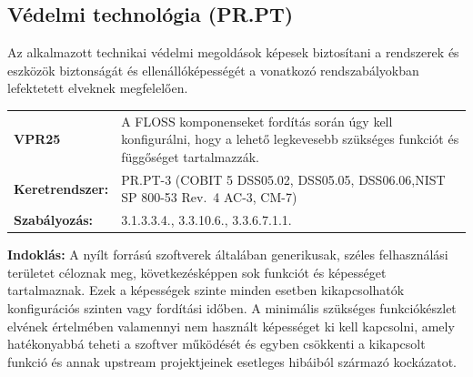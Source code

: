 \documentclass[12pt,magyar,a4paper,oneside]{scrreprt}
\begin{document}
\hypertarget{vuxe9delmi-technoluxf3gia-pr.pt}{%
\subsection{Védelmi technológia
(PR.PT)}\label{vuxe9delmi-technoluxf3gia-pr.pt}}

Az alkalmazott technikai védelmi megoldások képesek biztosítani a
rendszerek és eszközök biztonságát és ellenállóképességét a vonatkozó
rendszabályokban lefektetett elveknek megfelelően.

\begin{longtable}[]{@{}ll@{}}
\toprule
\endhead
\begin{minipage}[t]{0.16\columnwidth}\raggedright
\textbf{VPR25}\strut
\end{minipage} & \begin{minipage}[t]{0.79\columnwidth}\raggedright
A FLOSS komponenseket fordítás során úgy kell konfigurálni, hogy a
lehető legkevesebb szükséges funkciót és függőséget tartalmazzák.\strut
\end{minipage}\tabularnewline
\begin{minipage}[t]{0.16\columnwidth}\raggedright
\textbf{Keretrendszer:}\strut
\end{minipage} & \begin{minipage}[t]{0.79\columnwidth}\raggedright
PR.PT-3 (COBIT 5 DSS05.02, DSS05.05, DSS06.06,NIST SP 800-53 Rev.~4
AC-3, CM-7)\strut
\end{minipage}\tabularnewline
\begin{minipage}[t]{0.16\columnwidth}\raggedright
\textbf{Szabályozás:}\strut
\end{minipage} & \begin{minipage}[t]{0.79\columnwidth}\raggedright
3.1.3.3.4., 3.3.10.6., 3.3.6.7.1.1.\strut
\end{minipage}\tabularnewline
\bottomrule
\end{longtable}

\textbf{Indoklás: } A nyílt forrású szoftverek általában generikusak,
széles felhasználási területet céloznak meg, következésképpen sok
funkciót és képességet tartalmaznak. Ezek a képességek szinte minden
esetben kikapcsolhatók konfigurációs szinten vagy fordítási időben. A
minimális szükséges funkciókészlet elvének értelmében valamennyi nem
használt képességet ki kell kapcsolni, amely hatékonyabbá teheti a
szoftver működését és egyben csökkenti a kikapcsolt funkció és annak
upstream projektjeinek esetleges hibáiból származó kockázatot.
\end{document}
